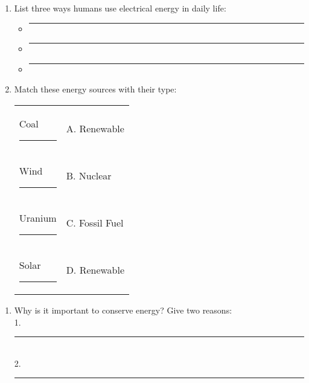 \documentclass[11pt]{article}
\begin{document}
\vspace{1em}

\begin{conceptbox}
\begin{enumerate}[label=\arabic*., start=6, itemsep=8pt]
\item List three ways humans use electrical energy in daily life:
\begin{itemize}[label=$\square$]
\item \rule{0.8\textwidth}{0.5pt}
\item \rule{0.8\textwidth}{0.5pt}
\item \rule{0.8\textwidth}{0.5pt}
\end{itemize}

\item Match these energy sources with their type:\\[6pt]
\begin{tabular}{ll}
Coal \rule{2cm}{0.5pt} & A. Renewable\\
Wind \rule{2cm}{0.5pt} & B. Nuclear\\
Uranium \rule{2cm}{0.5pt} & C. Fossil Fuel\\
Solar \rule{2cm}{0.5pt} & D. Renewable
\end{tabular}
\end{enumerate}
\end{conceptbox}

\vspace{1em}

\begin{conceptbox}
\begin{enumerate}[label=\arabic*., start=8, itemsep=8pt]
\item Why is it important to conserve energy? Give two reasons:\\
1. \rule{0.9\textwidth}{0.5pt}\\[4pt]
2. \rule{0.9\textwidth}{0.5pt}
\end{enumerate}
\end{conceptbox}

\vspace{1em}
\end{document}
